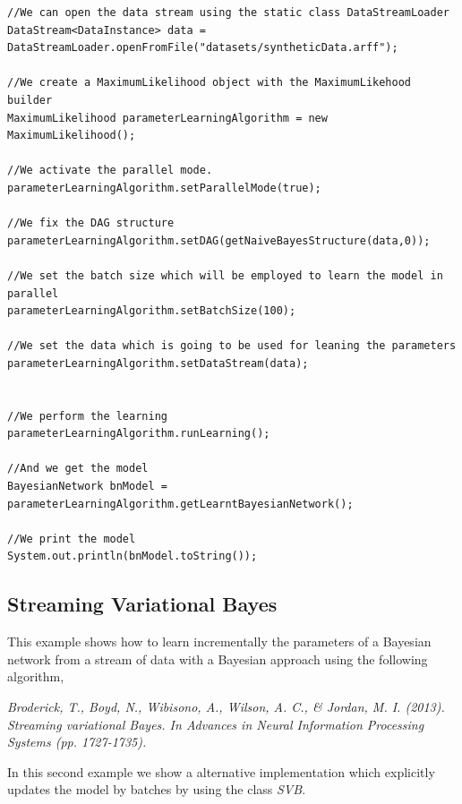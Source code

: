 \begin{lstlisting}
//We can open the data stream using the static class DataStreamLoader
DataStream<DataInstance> data = DataStreamLoader.openFromFile("datasets/syntheticData.arff");

//We create a MaximumLikelihood object with the MaximumLikehood builder
MaximumLikelihood parameterLearningAlgorithm = new MaximumLikelihood();

//We activate the parallel mode.
parameterLearningAlgorithm.setParallelMode(true);

//We fix the DAG structure
parameterLearningAlgorithm.setDAG(getNaiveBayesStructure(data,0));

//We set the batch size which will be employed to learn the model in parallel
parameterLearningAlgorithm.setBatchSize(100);

//We set the data which is going to be used for leaning the parameters
parameterLearningAlgorithm.setDataStream(data);


//We perform the learning
parameterLearningAlgorithm.runLearning();

//And we get the model
BayesianNetwork bnModel = parameterLearningAlgorithm.getLearntBayesianNetwork();

//We print the model
System.out.println(bnModel.toString());
\end{lstlisting}



\subsection{Streaming Variational Bayes}

This example shows how to learn incrementally the parameters of a Bayesian network from a stream of data with a Bayesian approach using the following algorithm,

\textit{Broderick, T., Boyd, N., Wibisono, A., Wilson, A. C., \& Jordan, M. I. (2013). Streaming variational Bayes. 
In Advances in Neural Information Processing Systems (pp. 1727-1735).}

In this second example we show a alternative implementation which explicitly updates the model by batches by using the class \textit{SVB}.


